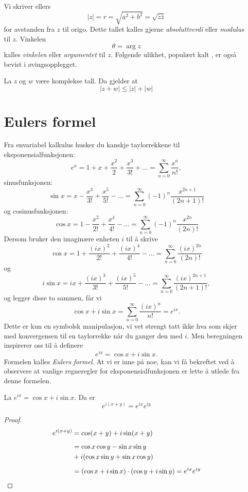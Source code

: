  Vi skriver ellers
 \[|z|=r=\sqrt{a^2+b^2}=\sqrt{z\overline z}\]
 for avstanden fra $z$ til origo. 
 Dette tallet kalles gjerne \emph{absoluttverdi} eller \emph{modulus} til $z$. 
 Vinkelen 
 \[
 \theta= \arg z
 \] 
 kalles \emph{vinkelen} eller \emph{argumentet} til $z$. Følgende ulikhet, populært kalt , er også bevist i øvingsopplegget.

\begin{tcolorbox}
\begin{thm}
La $z$ og $w$ være komplekse tall. Da gjelder at
\[
|z+w|\leq |z| + |w|
\]
\end{thm}
\vspace{1mm}
\end{tcolorbox}


\section*{Eulers formel}
Fra envariabel kalkulus husker du kanskje taylorrekkene til eksponensialfunksjonen:
\[
e^{x}=1+x+\frac{x^{2}}{2}+\frac{x^{3}}{3!}+\dots=\sum_{n=0}^{\infty}\frac{x^{n}}{n!}, 
\]
sinusfunksjonen:
\[
\sin{x}=x-\frac{x^{3}}{3!}+\frac{x^{5}}{5!}-\dots=\sum_{n=0}^{\infty}(-1)^{n}\frac{x^{2n+1}}{(2n+1)!} 
\]
og cosinusfunksjonen:
\[
\cos{x}=1-\frac{x^{2}}{2!}+\frac{x^{4}}{4!}-\dots=\sum_{n=0}^{\infty}(-1)^{n}\frac{x^{2n}}{(2n)!}
\]
Dersom bruker den imaginære enheten $i$ til å skrive
\[
\cos{x}=1+\frac{(ix)^{2}}{2!}+\frac{(ix)^{4}}{4!}-\dots=\sum_{n=0}^{\infty}\frac{(ix)^{2n}}{(2n)!}
\]
og 
\[
i\sin{x}=ix+\frac{(ix)^{3}}{3!}+\frac{(ix)^{5}}{5!}-\dots=\sum_{n=0}^{\infty}\frac{(ix)^{2n+1}}{(2n+1)!},
\]
og legger disse to sammen, får vi 
\[
\cos x + i\sin x=\sum_{n=0}^{\infty}\frac{(ix)^{n}}{n!}=e^{ix}.
\]
Dette er kun en symbolsk manipulasjon, 
vi vet strengt tatt ikke hva som skjer med konvergensen til en taylorrekke når du ganger den med $i$. 
Men beregningen inspirerer oss til å definere
\[
e^{ix}=\cos x + i\sin x.
\]
Formelen kalles \emph{Eulers formel}. 
At vi er inne på noe, kan vi få bekreftet ved å observere at 
vanlige regneregler for eksponensialfunksjonen er lette å utlede fra denne formelen. 
\begin{tcolorbox}
\begin{thm}
La
$
e^{ix}=\cos x + i\sin x.
$
Da er
\[
e^{i(x+y)}  = e^{ix}e^{iy}
\]
\end{thm}
\vspace{1mm}
\end{tcolorbox}
\begin{proof}
\begin{align*}
e^{i(x+y)}  &= \cos (x+y) + i\sin (x+y) \\[5pt] &= \cos x \cos y - \sin x \sin y \\ &+ i (\cos x \sin y + \sin x \cos y) \\[5pt] &= 
(\cos x+ i \sin x) \cdot (\cos y+ i \sin y) = e^{ix}e^{iy} \qedhere
\end{align*}
\end{proof}

